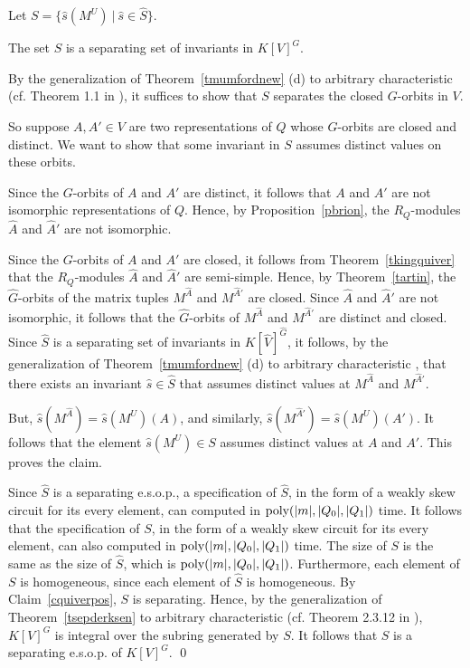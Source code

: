\documentclass[11pt]{article}
\begin{document}
Let $S=\{ \hat s(M^U) \ | \ \hat s \in \hat  S\}$. 

\begin{claim} \label{cquiverpos}
The set $S$ is a separating set of invariants in $K[V]^G$.
\end{claim}

By the generalization of Theorem~\ref{tmumfordnew} (d) to
arbitrary characteristic (cf. Theorem 1.1 in \cite{mumford}), it suffices to show that $S$ separates the closed $G$-orbits 
in $V$. 

So suppose $A,A' \in V$ are two representations of $Q$ whose $G$-orbits are closed and distinct.
We want to show that some invariant in $S$ assumes distinct values on these orbits. 

Since the $G$-orbits of $A$ and $A'$ are distinct, it follows that $A$ and $A'$ are not isomorphic
representations of $Q$.
Hence, by Proposition~\ref{pbrion}, the $R_Q$-modules $\hat A$ and $\hat A'$ are  not isomorphic.


Since the $G$-orbits of $A$ and $A'$ are closed, it follows from 
Theorem~\ref{tkingquiver} that  the $R_Q$-modules $\hat A$ and $\hat A'$ are semi-simple. 
Hence, by Theorem~\ref{tartin}, the $\hat G$-orbits of the matrix tuples $M^{\hat A}$ and 
$M^{\hat A'}$  are  closed.
Since $\hat A$ and $\hat A'$ are   not isomorphic, it follows that
the $\hat G$-orbits of $M^{\hat A}$ and $M^{\hat A'}$ are distinct and closed.
Since $\hat S$ is a separating set of invariants in $K[\hat V]^{\hat G}$, it follows,
by the generalization of Theorem~\ref{tmumfordnew} (d) to
arbitrary characteristic \cite{mumford}, 
that there exists an invariant $\hat s \in \hat S$ that assumes distinct values at $M^{\hat A}$
and $M^{\hat A'}$. 

But, $\hat s(M^{\hat A})= \hat s(M^U)(A)$, and similarly, 
$\hat s(M^{\hat A'})= \hat s(M^U)(A')$. It follows that 
the element $\hat s(M^U) \in S$ assumes distinct values at $A$ and $A'$. This proves the claim.

Since $\hat S$ is a separating e.s.o.p., a specification of $\hat S$, in the form of 
a weakly skew circuit for its every element, can computed in ${\mbox {poly}}(|m|,|Q_0|, |Q_1|)$ time.
It follows that the specification of $S$,
in the form of a
weakly skew circuit for its every  element, can also computed in ${\mbox {poly}}(|m|,|Q_0|, |Q_1|)$ time.
The size of $S$ is the same as the size of $\hat S$, which is ${\mbox {poly}}(|m|,|Q_0|, |Q_1|)$.
Furthermore, each element of $S$ is homogeneous, since each element of 
$\hat S$ is homogeneous.
By Claim~\ref{cquiverpos}, $S$ is separating. 
Hence, by the generalization of Theorem~\ref{tsepderksen} to arbitrary characteristic
(cf. Theorem 2.3.12 in \cite{derksenbook}), 
$K[V]^G$ is integral over the subring generated by $S$.
It follows that $S$ is a separating e.s.o.p.
of $K[V]^G$. \qed 
\end{document}
